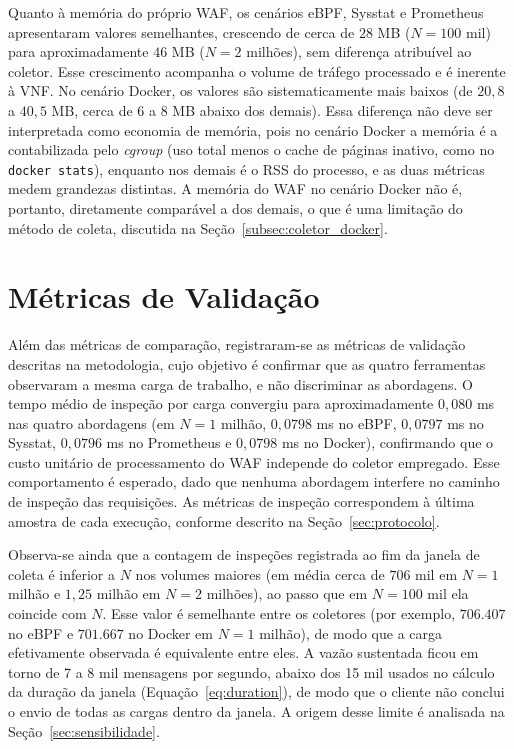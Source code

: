Quanto à memória do próprio WAF, os cenários eBPF, Sysstat e Prometheus apresentaram valores semelhantes, crescendo de cerca de $28$ MB ($N = 100$ mil) para aproximadamente $46$ MB ($N = 2$ milhões), sem diferença atribuível ao coletor. Esse crescimento acompanha o volume de tráfego processado e é inerente à VNF. No cenário Docker, os valores são sistematicamente mais baixos (de $20{,}8$ a $40{,}5$ MB, cerca de $6$ a $8$ MB abaixo dos demais). Essa diferença não deve ser interpretada como economia de memória, pois no cenário Docker a memória é a contabilizada pelo \textit{cgroup} (uso total menos o cache de páginas inativo, como no \texttt{docker stats}), enquanto nos demais é o RSS do processo, e as duas métricas medem grandezas distintas. A memória do WAF no cenário Docker não é, portanto, diretamente comparável a dos demais, o que é uma limitação do método de coleta, discutida na Seção~\ref{subsec:coletor_docker}.

\section{Métricas de Validação}

Além das métricas de comparação, registraram-se as métricas de validação descritas na metodologia, cujo objetivo é confirmar que as quatro ferramentas observaram a mesma carga de trabalho, e não discriminar as abordagens. O tempo médio de inspeção por carga convergiu para aproximadamente $0{,}080$ ms nas quatro abordagens (em $N = 1$ milhão, $0{,}0798$ ms no eBPF, $0{,}0797$ ms no Sysstat, $0{,}0796$ ms no Prometheus e $0{,}0798$ ms no Docker), confirmando que o custo unitário de processamento do WAF independe do coletor empregado. Esse comportamento é esperado, dado que nenhuma abordagem interfere no caminho de inspeção das requisições. As métricas de inspeção correspondem à última amostra de cada execução, conforme descrito na Seção~\ref{sec:protocolo}.

Observa-se ainda que a contagem de inspeções registrada ao fim da janela de coleta é inferior a $N$ nos volumes maiores (em média cerca de $706$ mil em $N = 1$ milhão e $1{,}25$ milhão em $N = 2$ milhões), ao passo que em $N = 100$ mil ela coincide com $N$. Esse valor é semelhante entre os coletores (por exemplo, $706.407$ no eBPF e $701.667$ no Docker em $N = 1$ milhão), de modo que a carga efetivamente observada é equivalente entre eles. A vazão sustentada ficou em torno de 7 a 8 mil mensagens por segundo, abaixo dos 15 mil usados no cálculo da duração da janela (Equação~\ref{eq:duration}), de modo que o cliente não conclui o envio de todas as cargas dentro da janela. A origem desse limite é analisada na Seção~\ref{sec:sensibilidade}.

